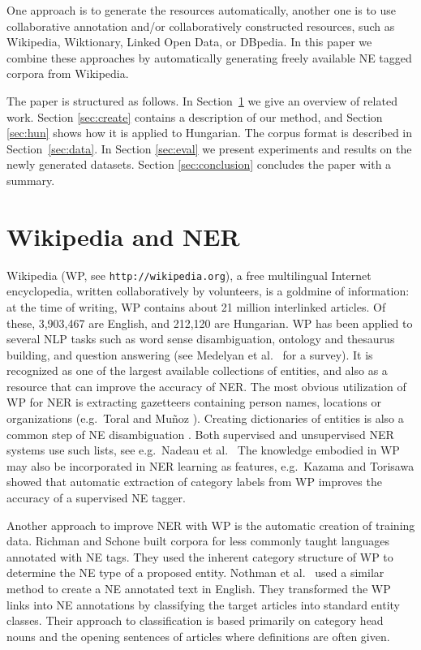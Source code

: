 \documentclass[11pt]{article}
\begin{document}
One approach is to generate the resources automatically, another one is to use
collaborative annotation and/or collaboratively constructed resources, such as
Wikipedia, Wiktionary, Linked Open Data, or DBpedia. In this paper we combine
these approaches by automatically generating freely available NE tagged
corpora from Wikipedia.

The paper is structured as follows. In
Section~\ref{sec:related} we give an overview of related work. Section
\ref{sec:create} contains a description of our method, and Section
\ref{sec:hun} shows how it is applied to Hungarian. The corpus format is
described in Section~\ref{sec:data}. In Section \ref{sec:eval} we present
experiments and results on the newly generated datasets. Section
\ref{sec:conclusion} concludes the paper with a summary.

\section{Wikipedia and NER}
\label{sec:related}

Wikipedia (WP, see {\tt http://wikipedia.org}), a free
multilingual Internet encyclopedia, written collaboratively by volunteers, is
a goldmine of information: at the time of writing, WP contains about 21
million interlinked articles. Of these, 3,903,467 are English, and 212,120 are
Hungarian. WP has been applied to several NLP tasks such as word sense
disambiguation, ontology and thesaurus building, and question answering (see
Medelyan et al.~ for a survey). It is recognized as one
of the largest available collections of entities, and also as a resource that
can improve the accuracy of NER. The most obvious utilization of WP for NER is
extracting gazetteers containing person names, locations or organizations
(e.g.~Toral and Mu\~noz ). Creating dictionaries of
entities is also a common step of NE disambiguation
\cite{Bunescu:06,Cucerzan:07}. Both supervised and unsupervised NER systems
use such lists, see e.g.~Nadeau et al.~ The knowledge
embodied in WP may also be incorporated in NER learning as features,
e.g.~Kazama and Torisawa  showed that automatic
extraction of category labels from WP improves the accuracy of a supervised NE
tagger.

Another approach to improve NER with WP is the automatic creation of training
data. Richman and Schone  built corpora for less
commonly taught languages annotated with NE tags. They used the inherent
category structure of WP to determine the NE type of a proposed
entity. Nothman et al.~ used a similar method to create
a NE annotated text in English. They transformed the WP links into NE
annotations by classifying the target articles into standard entity
classes. Their approach to classification is based primarily on category head
nouns and the opening sentences of articles where definitions are often given.
\end{document}
